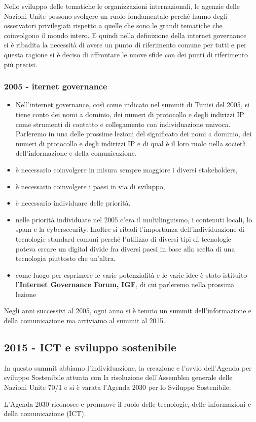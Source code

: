  Nello sviluppo delle tematiche le organizzazioni internazionali, le agenzie delle Nazioni Unite possono svolgere un ruolo fondamentale perché hanno degli osservatori privilegiati rispetto a quelle che sono le grandi tematiche che coinvolgono il mondo intero. E quindi nella definizione della internet governance si è ribadita la necessità di avere un punto di riferimento comune per tutti e per questa ragione si è deciso di affrontare le nuove sfide con dei punti di riferimento più precisi. 

 \subsubsection{2005 - iternet governance}
 
\begin{itemize}
    \item Nell'internet governance, così come indicato nel summit di Tunisi del 2005, si tiene conto dei nomi a dominio, dei numeri di protocollo e degli indirizzi IP come strumenti di contatto e collegamento con individuazione univoca. Parleremo in una delle prossime lezioni del significato dei nomi a dominio, dei numeri di protocollo e degli indirizzi IP e di qual è il loro ruolo nella società dell'informazione e della comunicazione. 
 
    \item è necessario coinvolgere in misura sempre maggiore i diversi stakeholders, 
    \item è necessario coinvolgere i paesi in via di sviluppo, 
    \item è necessario individuare delle priorità.
    \item nelle priorità individuate nel 2005 c'era il multilinguismo, i contenuti locali, lo spam e la cybersecurity. Inoltre si ribadì l'importanza dell'individuazione di tecnologie standard comuni perché l'utilizzo di diversi tipi di tecnologie poteva creare un digital divide fra diversi paesi in base alla scelta di una tecnologia piuttosto che un'altra.
    \item come luogo per esprimere le varie potenzialità e le varie idee è stato istituito l'\textbf{Internet Governance Forum, IGF}, di cui parleremo nella prossima lezione
\end{itemize}
 
 
 Negli anni successivi al 2005, ogni anno si è tenuto un summit dell'informazione e della comunicazione ma arriviamo al summit al 2015.
 
 \subsection{2015 - ICT e sviluppo sostenibile}
 In questo summit abbiamo l'individuazione, la creazione e l'avvio dell'Agenda per sviluppo Sostenibile attuata con la risoluzione dell'Assemblea generale delle Nazioni Unite 70/1 e si è varata l'Agenda 2030 per lo Sviluppo Sostenibile. \par
 L'Agenda 2030 riconosce e promuove il ruolo delle tecnologie, delle informazioni e della comunicazione (ICT). \par 
 
